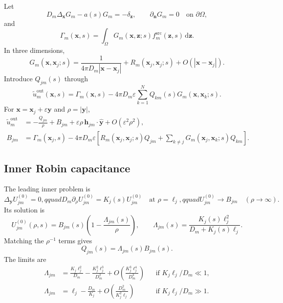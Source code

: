 \documentclass[pdflatex,sn-mathphys-num]{sn-jnl}
\numberwithin{equation}{section}
\theoremstyle{thmstyleone}%
\theoremstyle{definition}
\theoremstyle{remark}
\begin{document}
\begin{appendices}
Let
\begin{equation}
D_m\Delta_{\mathbf x}G_m-a(s)G_m=-\delta_{\mathbf z},
\qquad \partial_{\mathbf n}G_m=0\quad\text{on }\partial\Omega,
\label{eq:app_3d_green}
\end{equation}
and
\begin{equation}
\Gamma_m(\mathbf x,s)=\int_\Omega
G_m(\mathbf x,\mathbf z;s)f_m^{\mathrm{src}}(\mathbf z,s)
\,\mathrm d\mathbf z.
\label{eq:app_3d_forcing}
\end{equation}
In three dimensions,
\begin{equation}
G_m(\mathbf x,\mathbf x_j;s)=
\frac1{4\pi D_m|\mathbf x-\mathbf x_j|}
+R_m(\mathbf x_j,\mathbf x_j;s)+O(|\mathbf x-\mathbf x_j|).
\label{eq:app_3d_green_local}
\end{equation}
Introduce $Q_{jm}(s)$ through
\begin{equation}
\widetilde u_m^{\mathrm{out}}(\mathbf x,s)=
\Gamma_m(\mathbf x,s)-4\pi D_m\varepsilon
\sum_{k=1}^NQ_{km}(s)G_m(\mathbf x,\mathbf x_k;s).
\label{eq:app_3d_outer}
\end{equation}
For $\mathbf x=\mathbf x_j+\varepsilon\mathbf y$ and $\rho=|\mathbf y|$,
\begin{align}
\widetilde u_m^{\mathrm{out}}
&=-\frac{Q_{jm}}\rho+B_{jm}
+\varepsilon\rho\,\mathbf h_{jm}\cdot\widehat{\mathbf y}
+O(\varepsilon^2\rho^2),
\label{eq:app_3d_outer_local}\\
B_{jm}
&=\Gamma_m(\mathbf x_j,s)-4\pi D_m\varepsilon\left[
R_m(\mathbf x_j,\mathbf x_j;s)Q_{jm}
+\sum_{k\ne j}G_m(\mathbf x_j,\mathbf x_k;s)Q_{km}\right].
\label{eq:app_3d_Bj}
\end{align}

\subsection{Inner Robin capacitance}

The leading inner problem is
\begin{equation}
\Delta_{\mathbf y}U^{(0)}_{jm}=0,qquad
D_m\partial_\rho U^{(0)}_{jm}=K_j(s)U^{(0)}_{jm}
\quad\text{at }\rho=\ell_j,qquad
U^{(0)}_{jm}\to B_{jm}\quad(\rho\to\infty).
\label{eq:app_3d_inner_problem}
\end{equation}
Its solution is
\begin{equation}
U^{(0)}_{jm}(\rho,s)=B_{jm}(s)
\left(1-\frac{\Lambda_{jm}(s)}\rho\right),
\qquad
\Lambda_{jm}(s)=\frac{K_j(s)\ell_j^2}{D_m+K_j(s)\ell_j}.
\label{eq:app_3d_lambda}
\end{equation}
Matching the $\rho^{-1}$ terms gives
\begin{equation}
Q_{jm}(s)=\Lambda_{jm}(s)B_{jm}(s).
\label{eq:app_3d_Q_match}
\end{equation}
The limits are
\begin{align}
\Lambda_{jm}&=\frac{K_j\ell_j^2}{D_m}
-\frac{K_j^2\ell_j^3}{D_m^2}
+O\!\left(\frac{K_j^3\ell_j^4}{D_m^3}\right)
&&\text{if }K_j\ell_j/D_m\ll1,\\
\Lambda_{jm}&=\ell_j-\frac{D_m}{K_j}
+O\!\left(\frac{D_m^2}{K_j^2\ell_j}\right)
&&\text{if }K_j\ell_j/D_m\gg1.
\end{align}


\end{appendices}
\end{document}
